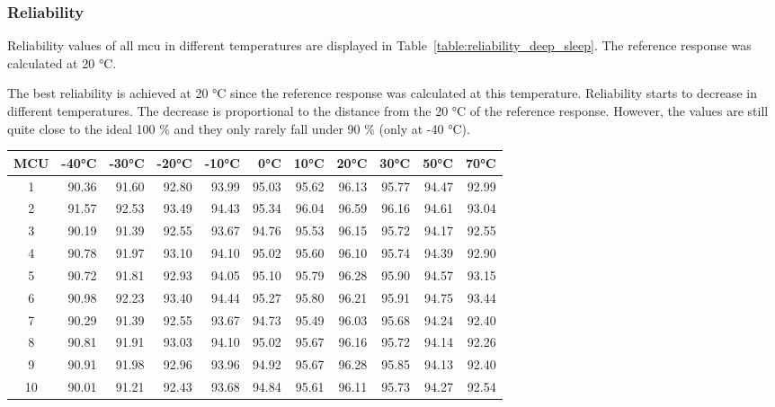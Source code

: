 \subsubsection*{Reliability}

Reliability values of all \gls{mcu} in different temperatures are displayed in Table~\ref{table:reliability_deep_sleep}. The reference response was calculated at 20 °C.

The best reliability is achieved at 20 °C since the reference response was calculated at this temperature. Reliability starts to decrease in different temperatures. The decrease is proportional to the distance from the 20 °C of the reference response. However, the values are still quite close to the ideal 100 \% and they only rarely fall under 90 \% (only at -40 °C).

\begin{table}[ht!]
    \centering
    \begin{tabular}{c||rrrrrrrrrr}
    \toprule
    \textbf{MCU} & \textbf{-40°C} & \textbf{-30°C} & \textbf{-20°C} & \textbf{-10°C} & \textbf{0°C} & \textbf{10°C} & \textbf{20°C} & \textbf{30°C} & \textbf{50°C} & \textbf{70°C} \\
    \midrule
    1    &  90.36 &  91.60 &  92.80 &  93.99 & 95.03 & 95.62 & 96.13 & 95.77 & 94.47 & 92.99 \\
    2    &  91.57 &  92.53 &  93.49 &  94.43 & 95.34 & 96.04 & 96.59 & 96.16 & 94.61 & 93.04 \\
    3    &  90.19 &  91.39 &  92.55 &  93.67 & 94.76 & 95.53 & 96.15 & 95.72 & 94.17 & 92.55 \\
    4    &  90.78 &  91.97 &  93.10 &  94.10 & 95.02 & 95.60 & 96.10 & 95.74 & 94.39 & 92.90 \\
    5    &  90.72 &  91.81 &  92.93 &  94.05 & 95.10 & 95.79 & 96.28 & 95.90 & 94.57 & 93.15 \\
    6    &  90.98 &  92.23 &  93.40 &  94.44 & 95.27 & 95.80 & 96.21 & 95.91 & 94.75 & 93.44 \\
    7    &  90.29 &  91.39 &  92.55 &  93.67 & 94.73 & 95.49 & 96.03 & 95.68 & 94.24 & 92.40 \\
    8    &  90.81 &  91.91 &  93.03 &  94.10 & 95.02 & 95.67 & 96.16 & 95.72 & 94.14 & 92.26 \\
    9    &  90.91 &  91.98 &  92.96 &  93.96 & 94.92 & 95.67 & 96.28 & 95.85 & 94.13 & 92.40 \\
    10   &  90.01 &  91.21 &  92.43 &  93.68 & 94.84 & 95.61 & 96.11 & 95.73 & 94.27 & 92.54 \\

\end{tabular}
\end{table}
